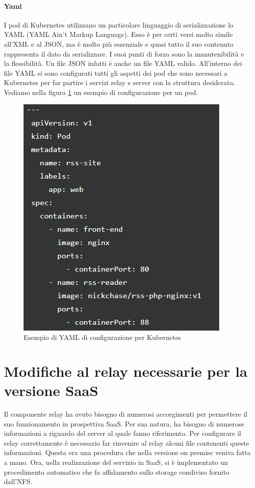 \paragraph{Yaml} 
I pod di Kubernetes utilizzano un particolare linguaggio di serializzazione lo YAML (YAML Ain't Markup Language). Esso è per certi versi molto simile all'XML e al JSON, ma è molto più essenziale e quasi tutto il suo contenuto rappresenta il dato da serializzare. I suoi punti di forza sono la manutenibilità e la flessibilità. Un file JSON infatti è anche un file YAML valido. All'interno dei file YAML si sono configurati tutti gli aspetti dei pod che sono necessari a Kubernetes per far partire i servizi relay e server con la struttura desiderata. Vediamo nella figura \ref{fig:yaml} un esempio di configurazione per un pod.
\begin{figure}
	\centering
	\includegraphics[width=0.5\linewidth]{capitoli/imgs/yaml}
	\caption{Esempio di YAML di configurazione per Kubernetes}
	\label{fig:yaml}
\end{figure}


\section{Modifiche al relay necessarie per la versione SaaS}
Il componente relay ha avuto bisogno di numerosi accorgimenti per permettere il suo funzionamento in prospettiva SaaS. Per sua natura, ha bisogno di numerose informazioni a riguardo del server al quale fanno riferimento. Per configurare il relay correttamente è necessario far rinvenire al relay alcuni file contenenti queste informazioni. Questa era una procedura che nella versione on premise veniva fatta a mano. Ora, nella realizzazione del servizio in SaaS, si è implementato un procedimento automatico che fa affidamento sullo storage condiviso fornito dall'NFS.
